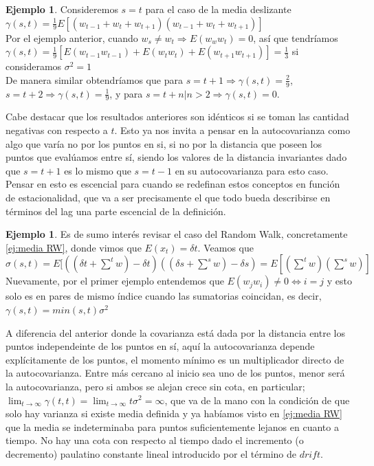\documentclass[11pt,a4paper,oneside]{report}
\theoremstyle{definition}
\newtheorem{ejemplo}[definicion]{Ejemplo}
\theoremstyle{plain}
\theoremstyle{remark}
\begin{document}
\begin{ejemplo}
  Consideremos $s=t$ para el caso de la media deslizante\\
  $\gamma(s,t)=\frac{1}{9}E[(w_{t-1}+w_{t}+w_{t+1})(w_{t-1}+w_{t}+w_{t+1})]$\\
  Por el ejemplo anterior, cuando $w_s\not = w_t\Rightarrow E(w_ww_t)=0$, así que tendríamos
  $\gamma(s,t)=\frac{1}{9}[E(w_{t-1}w_{t-1})+E(w_{t}w_t)+E(w_{t+1}w_{t+1})]=\frac{1}{3}$ si consideramos $\sigma^2=1$\\
  De manera similar obtendríamos que para $s=t+1 \Rightarrow \gamma(s,t)=\frac{2}{9}$, $s=t+2 \Rightarrow \gamma(s,t)=\frac{1}{9}$,
  y para $s=t+n | n>2 \Rightarrow \gamma(s,t)=0$.
\end{ejemplo}
Cabe destacar que los resultados anteriores son idénticos si se toman las cantidad negativas con respecto a $t$.
Esto ya nos invita a pensar en la autocovarianza como algo que varía no por los puntos en si, si no por la distancia
que poseen los puntos que evalúamos entre sí, siendo los valores de la distancia invariantes dado que $s=t+1$ es lo 
mismo que $s=t-1$ en su autocovarianza para esto caso. Pensar en esto es escencial para cuando se redefinan estos conceptos en función
de estacionalidad, que va a ser precisamente el que todo bueda describirse en términos del lag una parte escencial de la definición.

\begin{ejemplo}
  Es de sumo interés revisar el caso del Random Walk, concretamente \cref{ej:media RW}, donde vimos que
  $E(x_t)=\delta t$. Veamos que \\
  $\sigma(s,t)=E[((\delta t + \sum^{t}w)-\delta t )((\delta s + \sum^{s}w)-\delta s )=E[(\sum^{t}w)(\sum^{s}w)]$
  Nuevamente, por el primer ejemplo entendemos que $E(w_jw_i)\not = 0 \iff i=j$ y esto solo es en pares de mismo índice 
  cuando las sumatorias coincidan, es decir, $\gamma(s,t)=min(s,t)\sigma^{2}$
\end{ejemplo}
A diferencia del anterior donde la covarianza está dada por la distancia entre los puntos independeinte de los puntos en sí, 
aquí la autocovarianza depende explícitamente de los puntos, el momento mínimo es un multiplicador directo de la autocovarianza.
Entre más cercano al inicio sea uno de los puntos, menor será la autocovarianza, pero si ambos se alejan crece sin cota, en particular;
$\lim_{t\rightarrow \infty }\gamma (t,t)=\lim_{t\rightarrow \infty }t\sigma^{2}=\infty$, que va de la mano con la condición de que
solo hay varianza si existe media definida y ya habíamos visto en \cref{ej:media RW}  que la media se indeterminaba para 
puntos suficientemente lejanos en cuanto a tiempo. No hay una cota con respecto al tiempo dado el incremento (o decremento) paulatino
constante lineal introducido por el término de $drift$.
\end{document}
